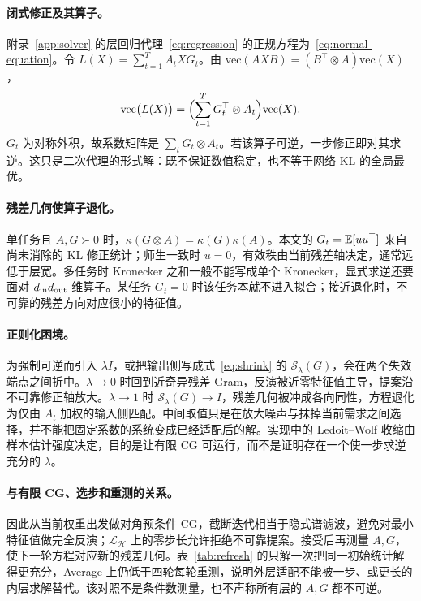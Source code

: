 \paragraph{闭式修正及其算子。}
附录~\ref{app:solver} 的层回归代理~\eqref{eq:regression} 的正规方程为~\eqref{eq:normal-equation}。令 $L(X)=\sum_{t=1}^T A_t X G_t$。由 $\mathrm{vec}(AXB)=(B^\top\otimes A)\mathrm{vec}(X)$，
\begin{equation}
 \mathrm{vec}\bigl(L(X)\bigr)
 =\Bigl(\sum_{t=1}^T G_t^\top\otimes A_t\Bigr)\mathrm{vec}(X).
 \label{eq:kronecker-sum}
\end{equation}
$G_t$ 为对称外积，故系数矩阵是 $\sum_t G_t\otimes A_t$。若该算子可逆，一步修正即对其求逆。这只是二次代理的形式解：既不保证数值稳定，也不等于网络 KL 的全局最优。

\paragraph{残差几何使算子退化。}
单任务且 $A,G\succ0$ 时，$\kappa(G\otimes A)=\kappa(G)\kappa(A)$。本文的 $G_t=\mathbb E[uu^\top]$ 来自尚未消除的 KL 修正统计；师生一致时 $u=0$，有效秩由当前残差轴决定，通常远低于层宽。多任务时 Kronecker 之和一般不能写成单个 Kronecker，显式求逆还要面对 $d_{\rm in}d_{\rm out}$ 维算子。某任务 $G_t=0$ 时该任务本就不进入拟合；接近退化时，不可靠的残差方向对应很小的特征值。

\paragraph{正则化困境。}
为强制可逆而引入 $\lambda I$，或把输出侧写成式~\eqref{eq:shrink} 的 $\mathcal S_\lambda(G)$，会在两个失效端点之间折中。$\lambda\to0$ 时回到近奇异残差 Gram，反演被近零特征值主导，提案沿不可靠修正轴放大。$\lambda\to1$ 时 $\mathcal S_\lambda(G)\to I$，残差几何被冲成各向同性，方程退化为仅由 $A_t$ 加权的输入侧匹配。中间取值只是在放大噪声与抹掉当前需求之间选择，并不能把固定系数的系统变成已经适配后的解。实现中的 Ledoit--Wolf 收缩由样本估计强度决定，目的是让有限 CG 可运行，而不是证明存在一个使一步求逆充分的 $\lambda$。

\paragraph{与有限 CG、选步和重测的关系。}
因此从当前权重出发做对角预条件 CG，截断迭代相当于隐式谱滤波，避免对最小特征值做完全反演；$\mathcal L_{\mathcal H}$ 上的零步长允许拒绝不可靠提案。接受后再测量 $A,G$，使下一轮方程对应新的残差几何。表~\ref{tab:refresh} 的只解一次把同一初始统计解得更充分，Average 上仍低于四轮每轮重测，说明外层适配不能被一步、或更长的内层求解替代。该对照不是条件数测量，也不声称所有层的 $A,G$ 都不可逆。

